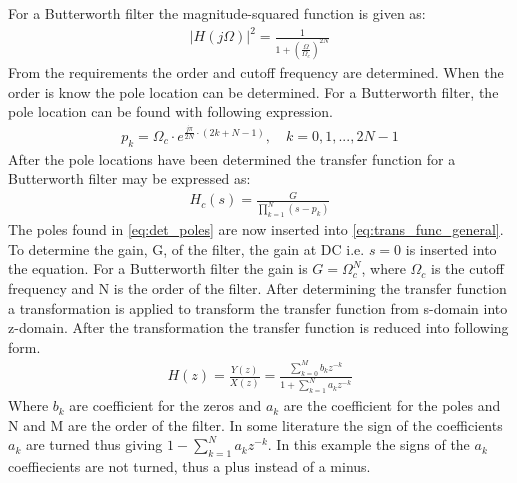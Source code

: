 For a Butterworth filter the magnitude-squared function is given as:
\begin{align}
|H(j\Omega)|^2 = \frac{1}{1+(\frac{\Omega}{\Omega_c})^{2N}}
\label{eq:mag_sq}
\end{align}
From the requirements the order and cutoff frequency are determined. When the order is know the pole location can be determined. For a Butterworth filter, the pole location can be found with following expression.
\begin{align}
p_k = \Omega_c \cdot e^{\frac{j\pi}{2N}\cdot (2k+N-1)}, \quad k=0,1, ..., 2N-1
\label{eq:det_poles}
\end{align}
After the pole locations have been determined the transfer function for a Butterworth filter may be expressed as:
\begin{align}
H_c(s) = \frac{G}{\prod\limits_{k=1}^{N}(s-p_k)} 
\label{eq:trans_func_general}
\end{align}
The poles found in \autoref{eq:det_poles} are now inserted into \autoref{eq:trans_func_general}. To determine the gain, G, of the filter, the gain at DC i.e. $s=0$ is inserted into the equation. For a Butterworth filter the gain is $G=\Omega_c^N$, where $\Omega_c$ is the cutoff frequency and N is the order of the filter. After determining the transfer function a transformation is applied to transform the transfer function from s-domain into z-domain. After the transformation the transfer function is reduced into following form.
\begin{align}
H(z) = \frac{Y(z)}{X(z)} = \frac{\sum\limits_{k=0}^{M}b_kz^{-k}}{1 + \sum\limits_{k=1}^{N}a_kz^{-k}} 
\label{eq:trans_standard}
\end{align}
Where $b_k$ are coefficient for the zeros and $a_k$ are the coefficient for the poles and N and M are the order of the filter. In some literature the sign of the  coefficients $a_k$ are turned thus giving $1 - \sum\limits_{k=1}^{N}a_kz^{-k}$. In this example the signs of the $a_k$ coeffiecients are not turned, thus a plus instead of a minus.

